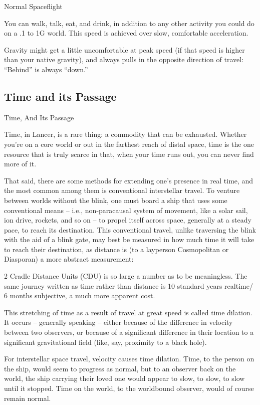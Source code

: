 Normal Spaceflight




You can walk, talk, eat, and drink, in addition to any other activity you could do on a .1 to 1G
world. This speed is achieved over slow, comfortable acceleration.


Gravity might get a little uncomfortable at peak speed (if that speed is higher than your
native gravity), and always pulls in the opposite direction of travel: “Behind” is always
“down.”

\subsection{Time and its Passage}
Time, And Its Passage

Time, in Lancer, is a rare thing: a commodity that can be exhausted. Whether you’re on a core
world or out in the farthest reach of distal space, time is the one resource that is truly scarce in
that, when your time runs out, you can never find more of it.

That said, there are some methods for extending one’s presence in real time, and the most
common among them is conventional interstellar travel. To venture between worlds without the
blink, one must board a ship that uses some conventional means  -- i.e., non-paracausal system
of movement, like a solar sail, ion drive, rockets, and so on -- to propel itself across space,
generally at a steady pace, to reach its destination. This conventional travel, unlike traversing the
blink with the aid of a blink gate, may best be measured in how much time it will take to reach
their destination, as distance is (to a layperson Cosmopolitan or Diasporan) a more abstract
measurement:

2 Cradle Distance Units (CDU) is so large a number as to be meaningless. The same journey
written as time rather than distance is 10 standard years realtime/ 6 months subjective, a much
more apparent cost.

This stretching of time as a result of travel at great speed is called time dilation. It occurs --
generally speaking -- either because of the difference in velocity between two observers, or
because of a significant difference in their location to a significant gravitational field (like,
say, proximity to a black hole).

For interstellar space travel, velocity causes time dilation. Time, to the person on the ship,
would seem to progress as normal, but to an observer back on the world, the ship carrying
their loved one would appear to slow, to slow, to slow until it stopped. Time on the world, to
the worldbound observer, would of course remain normal.

